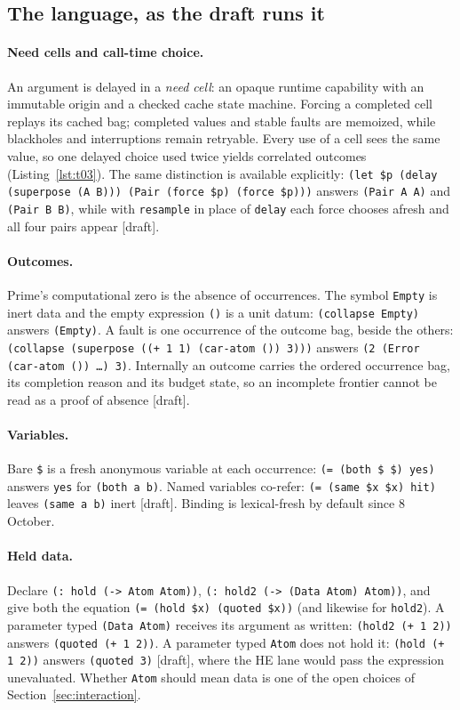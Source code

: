 \documentclass[11pt]{article}
\newcommand{\code}[1]{\texttt{#1}}
\newcommand{\kind}[1]{\textsf{\small[#1]}}
\newcommand{\HE}{\textup{HE}}
\begin{document}
\subsection{The language, as the draft runs it}

\paragraph{Need cells and call-time choice.}  An argument is delayed in a
\emph{need cell}: an opaque runtime capability with an immutable origin and a
checked cache state machine.  Forcing a completed cell replays its cached bag;
completed values and stable faults are memoized, while blackholes and
interruptions remain retryable.  Every use of a cell sees the same value, so
one delayed choice used twice yields correlated outcomes
(Listing~\ref{lst:t03}).  The same distinction is available explicitly:
\code{(let \$p (delay (superpose (A B))) (Pair (force \$p) (force \$p)))}
answers \code{(Pair A A)} and \code{(Pair B B)}, while with \code{resample} in
place of \code{delay} each force chooses afresh and all four pairs appear
\kind{draft}.

\paragraph{Outcomes.}  Prime's computational zero is the absence of
occurrences.  The symbol \code{Empty} is inert data and the empty expression
\code{()} is a unit datum: \code{(collapse Empty)} answers \code{(Empty)}.  A
fault is one occurrence of the outcome bag, beside the others:
\code{(collapse (superpose ((+ 1 1) (car-atom ()) 3)))} answers
\code{(2 (Error (car-atom ()) \ldots) 3)}.  Internally an outcome carries the
ordered occurrence bag, its completion reason and its budget state, so an
incomplete frontier cannot be read as a proof of absence \kind{draft}.

\paragraph{Variables.}  Bare \code{\$} is a fresh anonymous variable at each
occurrence: \code{(= (both \$ \$) yes)} answers \code{yes} for
\code{(both a b)}.  Named variables co-refer: \code{(= (same \$x \$x) hit)}
leaves \code{(same a b)} inert \kind{draft}.  Binding is lexical-fresh by
default since 8 October.

\paragraph{Held data.}  Declare \code{(: hold (-> Atom Atom))},
\code{(: hold2 (-> (Data Atom) Atom))}, and give both the equation
\code{(= (hold \$x) (quoted \$x))} (and likewise for \code{hold2}).  A
parameter typed \code{(Data Atom)} receives its argument as written:
\code{(hold2 (+ 1 2))} answers \code{(quoted (+ 1 2))}.  A parameter typed
\code{Atom} does not hold it: \code{(hold (+ 1 2))} answers
\code{(quoted 3)} \kind{draft}, where the \HE{} lane would pass the
expression unevaluated.  Whether \code{Atom} should mean data is one of the
open choices of Section~\ref{sec:interaction}.
\end{document}
